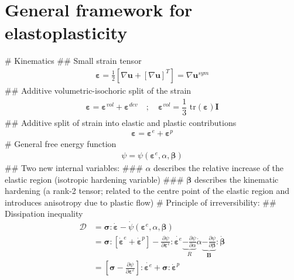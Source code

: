 \documentclass[]{scrartcl}
\begin{document}
\clearpage
\section{General framework for elastoplasticity}
\begin{easylist}[itemize]
# Kinematics
## Small strain tensor
\begin{gather}
\boldsymbol{\varepsilon} 
  = \frac{1}{2} \left[ \nabla \mathbf{u} + \left[ \nabla \mathbf{u} \right]^{T} \right]
  = \nabla\mathbf{u}^{sym}
\end{gather}
## Additive volumetric-isochoric split of the strain
\begin{gather}
\boldsymbol{\varepsilon} 
  = \boldsymbol{\varepsilon}^{vol} + \boldsymbol{\varepsilon}^{dev}
\quad ; \quad
\boldsymbol{\varepsilon}^{vol} = \dfrac{1}{3} \textrm{ tr}(\boldsymbol{\varepsilon}) \mathbf{I}
\end{gather}
## Additive split of strain into elastic and plastic contributions
\begin{gather*}
\boldsymbol{\varepsilon} 
  = \boldsymbol{\varepsilon}^{e} + \boldsymbol{\varepsilon}^{p}
\end{gather*}
# General free energy function
\begin{gather*}
\psi = \psi (\boldsymbol{\varepsilon}^{e}, \alpha, \boldsymbol{\beta})
\end{gather*}
## Two new internal variables:
### $\alpha$ describes the relative increase of the elastic region (isotropic hardening variable)
### $\boldsymbol{\beta}$ describes the kinematic hardening (a rank-2 tensor; related to the centre point of the elastic region and introduces anisotropy due to plastic flow)
# Principle of irreversibility: 
## Dissipation inequality
\begin{align*}
\mathcal{D} 
  &= \boldsymbol{\sigma} : \dot{\boldsymbol{\varepsilon}} - \dot\psi (\boldsymbol{\varepsilon}^{e}, \alpha, \boldsymbol{\beta}) \\
  &= \boldsymbol{\sigma} : \left[ \dot{\boldsymbol{\varepsilon}}^{e} + \dot{\boldsymbol{\varepsilon}}^{p} \right] 
  - \frac{\partial \psi}{\partial \boldsymbol{\varepsilon}^{e}} : \dot{\boldsymbol{\varepsilon}^{e}}
  \underbrace{- \frac{\partial \psi}{\partial \alpha}}_{R} \dot{\alpha}
  \underbrace{- \frac{\partial \psi}{\partial \boldsymbol{\beta}}}_{\boldsymbol{B}} : \dot{\boldsymbol{\beta}} \\ 
  &= \left[ \boldsymbol{\sigma} - \frac{\partial \psi}{\partial \boldsymbol{\varepsilon}^{e}} \right] : \dot{\boldsymbol{\varepsilon}^{e}}
  + \boldsymbol{\sigma} : \dot{\boldsymbol{\varepsilon}}^{p}

\end{align*}
\end{easylist}
\end{document}
